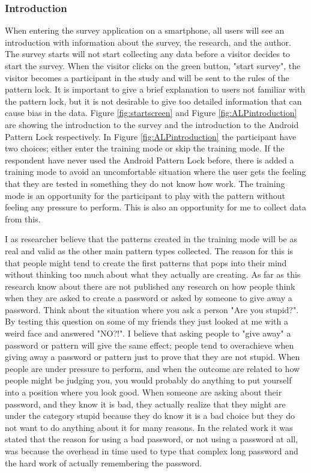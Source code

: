     \subsubsection{Introduction}
      When entering the survey application on a smartphone, all users will see an introduction with information about the survey, the research, and the author. The survey starts will not start collecting any data before a visitor decides to start the survey. When the visitor clicks on the green button, "start survey", the visitor becomes a participant in the study and will be sent to the rules of the pattern lock. It is important to give a brief explanation to users not familiar with the pattern lock, but it is not desirable to give too detailed information that can cause bias in the data. Figure \ref{fig:startscreen} and Figure \ref{fig:ALPintroduction} are showing the introduction to the survey and the introduction to the Android Pattern Lock respectively. In Figure \ref{fig:ALPintroduction} the participant have two choices; either enter the training mode or skip the training mode. If the respondent have never used the Android Pattern Lock before, there is added a training mode to avoid an uncomfortable situation where the user gets the feeling that they are tested in something they do not know how work. The training mode is an opportunity for the participant to play with the pattern without feeling any pressure to perform. This is also an opportunity for me to collect data from this.

      I as researcher believe that the patterns created in the training mode will be as real and valid as the other main pattern types collected. The reason for this is that people might tend to create the first patterns that pops into their mind without thinking too much about what they actually are creating. As far as this research know about there are not published any research on how people think when they are asked to create a password or asked by someone to give away a password. Think about the situation where you ask a person "Are you stupid?". By testing this question on some of my friends they just looked at me with a weird face and answered "NO?!". I believe that asking people to "give away" a password or pattern will give the same effect; people tend to overachieve when giving away a password or pattern just to prove that they are not stupid. When people are under pressure to perform, and when the outcome are related to how people might be judging you, you would probably do anything to put yourself into a position where you look good. When someone are asking about their password, and they know it is bad, they actually realize that they might are under the category stupid because they do know it is a bad choice but they do not want to do anything about it for many reasons. In the related work it was stated that the reason for using a bad password, or not using a password at all, was because the overhead in time used to type that complex long password and the hard work of actually remembering the password. 

